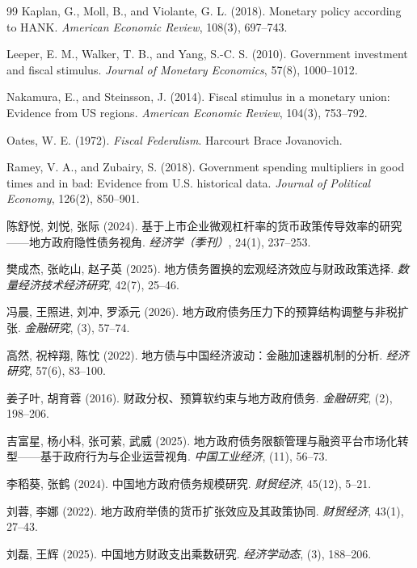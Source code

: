 \documentclass[12pt,UTF8]{ctexart}
\begin{document}
\begin{thebibliography}{99}
		Kaplan, G., Moll, B., and Violante, G. L. (2018). Monetary policy according to HANK. \textit{American Economic Review}, 108(3), 697--743.
		
		Leeper, E. M., Walker, T. B., and Yang, S.-C. S. (2010). Government investment and fiscal stimulus. \textit{Journal of Monetary Economics}, 57(8), 1000--1012.
		
		Nakamura, E., and Steinsson, J. (2014). Fiscal stimulus in a monetary union: Evidence from US regions. \textit{American Economic Review}, 104(3), 753--792.
		
		Oates, W. E. (1972). \textit{Fiscal Federalism}. Harcourt Brace Jovanovich.
		
		Ramey, V. A., and Zubairy, S. (2018). Government spending multipliers in good times and in bad: Evidence from U.S. historical data. \textit{Journal of Political Economy}, 126(2), 850--901.
		
		陈舒悦, 刘悦, 张际 (2024). 基于上市企业微观杠杆率的货币政策传导效率的研究——地方政府隐性债务视角. \textit{经济学（季刊）}, 24(1), 237--253.
		
		樊成杰, 张屹山, 赵子英 (2025). 地方债务置换的宏观经济效应与财政政策选择. \textit{数量经济技术经济研究}, 42(7), 25--46.
		
		冯晨, 王照进, 刘冲, 罗添元 (2026). 地方政府债务压力下的预算结构调整与非税扩张. \textit{金融研究}, (3), 57--74.
		
		高然, 祝梓翔, 陈忱 (2022). 地方债与中国经济波动：金融加速器机制的分析. \textit{经济研究}, 57(6), 83--100.
		
		姜子叶, 胡育蓉 (2016). 财政分权、预算软约束与地方政府债务. \textit{金融研究}, (2), 198--206.
		
		吉富星, 杨小科, 张可萦, 武威 (2025). 地方政府债务限额管理与融资平台市场化转型——基于政府行为与企业运营视角. \textit{中国工业经济}, (11), 56--73.
		
		李稻葵, 张鹤 (2024). 中国地方政府债务规模研究. \textit{财贸经济}, 45(12), 5--21.
		
		刘蓉, 李娜 (2022). 地方政府举债的货币扩张效应及其政策协同. \textit{财贸经济}, 43(1), 27--43.
		
		刘磊, 王辉 (2025). 中国地方财政支出乘数研究. \textit{经济学动态}, (3), 188--206.
		

\end{thebibliography}
\end{document}
